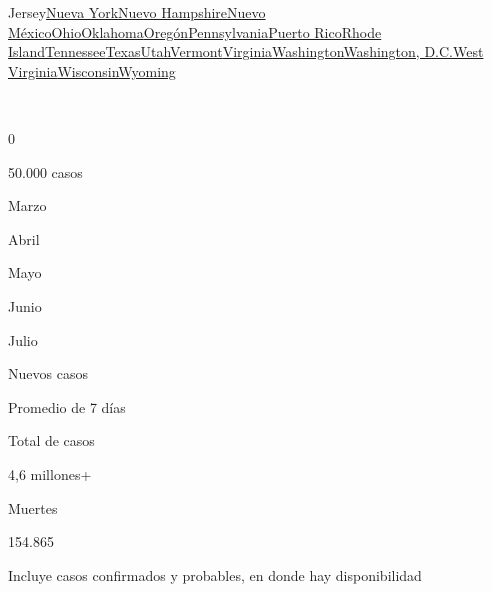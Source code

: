 {Jersey}\href{https://www.nytimes.com/interactive/2020/us/new-york-coronavirus-cases.html}{Nueva
York}\href{https://www.nytimes.com/interactive/2020/us/new-hampshire-coronavirus-cases.html}{Nuevo
Hampshire}\href{https://www.nytimes.com/interactive/2020/us/new-mexico-coronavirus-cases.html}{Nuevo
México}\href{https://www.nytimes.com/interactive/2020/us/ohio-coronavirus-cases.html}{Ohio}\href{https://www.nytimes.com/interactive/2020/us/oklahoma-coronavirus-cases.html}{Oklahoma}\href{https://www.nytimes.com/interactive/2020/us/oregon-coronavirus-cases.html}{Oregón}\href{https://www.nytimes.com/interactive/2020/us/pennsylvania-coronavirus-cases.html}{Pennsylvania}\href{https://www.nytimes.com/interactive/2020/us/puerto-rico-coronavirus-cases.html}{Puerto
Rico}\href{https://www.nytimes.com/interactive/2020/us/rhode-island-coronavirus-cases.html}{Rhode
Island}\href{https://www.nytimes.com/interactive/2020/us/tennessee-coronavirus-cases.html}{Tennessee}\href{https://www.nytimes.com/interactive/2020/us/texas-coronavirus-cases.html}{Texas}\href{https://www.nytimes.com/interactive/2020/us/utah-coronavirus-cases.html}{Utah}\href{https://www.nytimes.com/interactive/2020/us/vermont-coronavirus-cases.html}{Vermont}\href{https://www.nytimes.com/interactive/2020/us/virginia-coronavirus-cases.html}{Virginia}\href{https://www.nytimes.com/interactive/2020/us/washington-coronavirus-cases.html}{Washington}\href{https://www.nytimes.com/interactive/2020/us/washington-dc-coronavirus-cases.html}{Washington,
D.C.}\href{https://www.nytimes.com/interactive/2020/us/west-virginia-coronavirus-cases.html}{West
Virginia}\href{https://www.nytimes.com/interactive/2020/us/wisconsin-coronavirus-cases.html}{Wisconsin}\href{https://www.nytimes.com/interactive/2020/us/wyoming-coronavirus-cases.html}{Wyoming}

~

0

50.000 casos

Marzo

Abril

Mayo

Junio

Julio

Nuevos casos

Promedio de 7 días

Total de casos

4,6 millones+

Muertes

154.865

Incluye casos confirmados y probables, en donde hay disponibilidad

